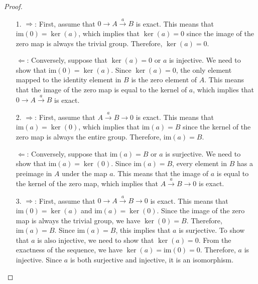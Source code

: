 \documentclass{amsart}
\begin{document}
\begin{proof}
\begin{enumerate}
	\item[]
	\item[1.] \glqq $\Rightarrow$\grqq{}: First, assume that $0 \xrightarrow{} A \xrightarrow{a} B$ is exact. This means that $\text{im}(0) = \ker(a)$, which implies that $\ker(a) = 0$ since the image of the zero map is always the trivial group. Therefore, $\ker(a) = 0$.

	\glqq $\Leftarrow$\grqq{}: Conversely, suppose that $\ker(a) = 0$ or $a$ is injective. We need to show that $\text{im}(0) = \ker(a)$. Since $\ker(a) = 0$, the only element mapped to the identity element in $B$ is the zero element of $A$. This means that the image of the zero map is equal to the kernel of $a$, which implies that $0 \xrightarrow{} A \xrightarrow{a} B$ is exact.
	\item[2.] \glqq $\Rightarrow$\grqq{}: First, assume that $A \xrightarrow{a} B \xrightarrow{} 0$ is exact. This means that $\text{im}(a) = \ker(0)$, which implies that $\text{im}(a) = B$ since the kernel of the zero map is always the entire group. Therefore, $\text{im}(a) = B$.

	\glqq $\Leftarrow$\grqq{}: Conversely, suppose that $\text{im}(a) = B$ or $a$ is surjective. We need to show that $\text{im}(a) = \ker(0)$. Since $\text{im}(a) = B$, every element in $B$ has a preimage in $A$ under the map $a$. This means that the image of $a$ is equal to the kernel of the zero map, which implies that $A \xrightarrow{a} B \rightarrow 0$ is exact.
	\item[3.] \glqq $\Rightarrow$\grqq{}: First, assume that $0 \xrightarrow{} A \xrightarrow{a} B \xrightarrow{} 0$ is exact. This means that $\text{im}(0) = \ker(a)$ and $\text{im}(a) = \ker(0)$. Since the image of the zero map is always the trivial group, we have $\ker(0) = B$. Therefore, $\text{im}(a) = B$. Since $\text{im}(a) = B$, this implies that $a$ is surjective. To show that $a$ is also injective, we need to show that $\ker(a) = 0$. From the exactness of the sequence, we have $\ker(a) = \text{im}(0) = 0$. Therefore, $a$ is injective. Since $a$ is both surjective and injective, it is an isomorphism.


\end{enumerate}
\end{proof}
\end{document}
